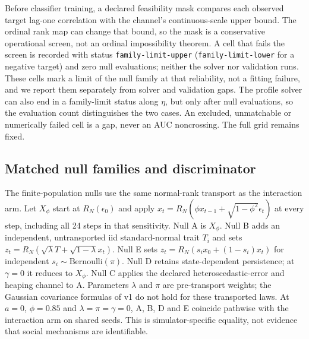 Before classifier training, a declared feasibility mask compares each observed target lag-one correlation with the channel's continuous-scale upper bound. %
The ordinal rank map can change that bound, so the mask is a conservative operational screen, not an ordinal impossibility theorem. %
A cell that fails the screen is recorded with status \texttt{family-limit-upper} (\texttt{family-limit-lower} for a negative target) and zero null evaluations; neither the solver nor validation runs. %
These cells mark a limit of the null family at that reliability, not a fitting failure, and we report them separately from solver and validation gaps. %
The profile solver can also end in a family-limit status along $\eta$, but only after null evaluations, so the evaluation count distinguishes the two cases. %
An excluded, unmatchable or numerically failed cell is a gap, never an AUC noncrossing. %
The full grid remains fixed. %

\subsection{Matched null families and discriminator}

The finite-population nulls use the same normal-rank transport as the interaction arm. %
Let $X_\phi$ start at $R_N(\epsilon_0)$ and apply $x_t=R_N(\phi x_{t-1}+\sqrt{1-\phi^2}\epsilon_t)$ at every step, including all 24 steps in that sensitivity. %
Null A is $X_\phi$. %
Null B adds an independent, untransported iid standard-normal trait $T_i$ and sets $z_t=R_N(\sqrt\lambda T+\sqrt{1-\lambda}x_t)$. %
Null E sets $z_t=R_N(s_i x_0+(1-s_i)x_t)$ for independent $s_i\sim\mathrm{Bernoulli}(\pi)$. %
Null D retains state-dependent persistence; at $\gamma=0$ it reduces to $X_\phi$. %
Null C applies the declared heteroscedastic-error and heaping channel to A. %
Parameters $\lambda$ and $\pi$ are pre-transport weights; the Gaussian covariance formulas of v1 do not hold for these transported laws. %
At $a=0$, $\phi=0.85$ and $\lambda=\pi=\gamma=0$, A, B, D and E coincide pathwise with the interaction arm on shared seeds. %
This is simulator-specific equality, not evidence that social mechanisms are identifiable. %

